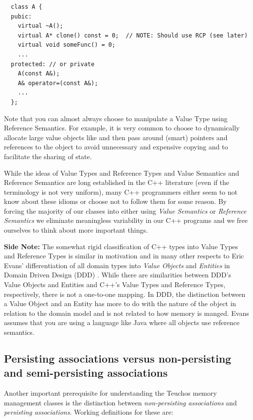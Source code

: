 \documentclass[pdf,ps2pdf,11pt]{SANDreport}
\begin{document}
{\small\begin{verbatim}
  class A {
  pubic:
    virtual ~A();
    virtual A* clone() const = 0;  // NOTE: Should use RCP (see later)
    virtual void someFunc() = 0;
    ...
  protected: // or private
    A(const A&);
    A& operator=(const A&);
    ...
  };
\end{verbatim}}

Note that you can almost always choose to manipulate a Value Type
using Reference Semantics.  For example, it is very common to choose
to dynamically allocate large value objects like
{} and then pass around (smart) pointers and
references to the object to avoid unnecessary and expensive copying
and to facilitate the sharing of state.

While the ideas of Value Types and Reference Types and Value Semantics
and Reference Semantics are long established in the C++ literature
(even if the terminology is not very uniform), many C++ programmers
either seem to not know about these idioms or choose not to follow them
for some reason.  By forcing the majority of our classes into either
using {}\textit{Value Semantics} or {}\textit{Reference Semantics} we
eliminate meaningless variability in our C++ programs and we free
ourselves to think about more important things.

{}\textbf{Side Note:} The somewhat rigid classification of C++ types
into Value Types and Reference Types is similar in motivation and in
many other respects to Eric Evans' differentiation of all domain types
into {}\textit{Value Objects} and {}\textit{Entities} in Domain Driven
Design (DDD) {}\cite{DomainDrivenDesign}.  While there are
similarities between DDD's Value Objects and Entities and C++'s Value
Types and Reference Types, respectively, there is not a one-to-one
mapping.  In DDD, the distinction between a Value Object and an Entity
has more to do with the nature of the object in relation to the domain
model and is not related to how memory is manged.  Evans assumes that
you are using a language like Java where all objects use reference
semantics.


%
{}\subsection{Persisting associations versus non-persisting and
semi-persisting associations}
\label{sec:persisting-nonpersisting-associations}
%

Another important prerequisite for understanding the Teuchos memory
management classes is the distinction between {}\textit{non-persisting
associations} and {}\textit{persisting associations}.  Working
definitions for these are:
\end{document}
